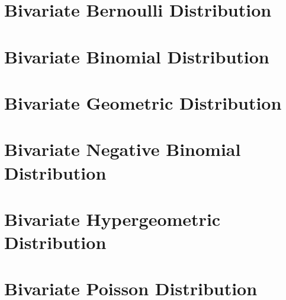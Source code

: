 \section{Bivariate Bernoulli Distribution}

\section{Bivariate Binomial Distribution}

\section{Bivariate Geometric Distribution}

\section{Bivariate Negative Binomial Distribution}

\section{Bivariate Hypergeometric Distribution}

\section{Bivariate Poisson Distribution}

